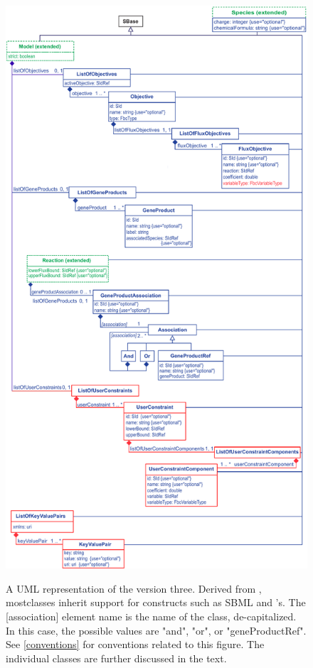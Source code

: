 \begin{figure}[ht!]
  \centering
  \includegraphics[height=0.85\textheight]{images/fbc_uml_v3.pdf}\\
  \caption{A UML representation of the \FBCPackage version three. Derived from \SBase, most\FBC classes inherit support for constructs such as SBML \Notes and \Annotation's. The [association] element name is the name of the class, de-capitalized. In this case, the possible values are "and", "or", or "geneProductRef". See \ref{conventions} for conventions related to this figure. The individual classes are further discussed in the text.}
  \label{fig:fbc_uml_v3}
\end{figure}


